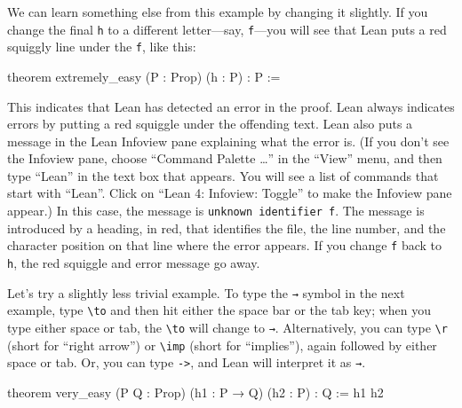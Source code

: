 \documentclass[
  letterpaper,
  DIV=11,
  numbers=noendperiod]{scrreprt}
\makeatletter
\newenvironment{Shaded}{\begin{snugshade}}{\end{snugshade}}
\newcommand{\ErrorTok}[1]{\textcolor[rgb]{0.68,0.00,0.00}{#1}}
\newcommand{\KeywordTok}[1]{\textcolor[rgb]{0.00,0.23,0.31}{#1}}
\newcommand{\NormalTok}[1]{\textcolor[rgb]{0.00,0.23,0.31}{#1}}
\newcommand{\SpecialCharTok}[1]{\textcolor[rgb]{0.37,0.37,0.37}{#1}}
\def\squiggly{\bgroup \markoverwith{\textcolor{red}{\lower3.5\p@\hbox{\sixly \char58}}}\ULon}
\renewcommand{\NormalTok}[1]{\textcolor[HTML]{000000}{#1}}
\renewcommand{\KeywordTok}[1]{\textcolor[HTML]{0000FF}{#1}}
\renewcommand{\SpecialCharTok}[1]{}
\renewcommand{\ErrorTok}[1]{\squiggly{#1}}
\newcommand{\excl}[1]{}
\makeatother
\begin{document}
We can learn something else from this example by changing it slightly.
If you change the final \texttt{h} to a different letter---say,
\texttt{f}---you will see that Lean puts a red squiggly line under the
\texttt{f}, like this:

\begin{Shaded}
\begin{Highlighting}[]
\KeywordTok{theorem}\NormalTok{ extremely\_easy (P : }\KeywordTok{Prop}\NormalTok{) (h : P) : P := }\SpecialCharTok{!!}\ErrorTok{f}\SpecialCharTok{!!}
\end{Highlighting}
\end{Shaded}

This indicates that Lean has detected an error in the proof. Lean always
indicates errors by putting a red squiggle under the offending text.
Lean also puts a message in the Lean Infoview pane explaining what the
error is. (If you don't see the Infoview pane, choose ``Command Palette
\ldots{}'' in the ``View'' menu, and then type ``Lean'' in the text box
that appears. You will see a list of commands that start with ``Lean''.
Click on ``Lean 4: Infoview: Toggle'' to make the Infoview pane appear.)
In this case, the message is
\texttt{unknown\ identifier\ \textquotesingle{}f\textquotesingle{}}. The
message is introduced by a heading, in red, that identifies the file,
the line number, and the character position on that line where the error
appears. If you change \texttt{f} back to \texttt{h}, the red squiggle
and error message go away.

Let's try a slightly less trivial example. To type the \texttt{→} symbol
in the next example, type \texttt{\textbackslash{}to} and then hit
either the space bar or the tab key; when you type either space or tab,
the \texttt{\textbackslash{}to} will change to \texttt{→}.
Alternatively, you can type \texttt{\textbackslash{}r} (short for
``right arrow'') or \texttt{\textbackslash{}imp} (short for
``implies''), again followed by either space or tab. Or, you can type
\excl{\texttt{-\textgreater{}}}\texttt{-\null>}, and Lean will interpret
it as \texttt{→}.

\begin{Shaded}
\begin{Highlighting}[]
\KeywordTok{theorem}\NormalTok{ very\_easy}
\NormalTok{(P Q : }\KeywordTok{Prop}\NormalTok{) (h1 : P → Q) (h2 : P) : Q := h1 h2}
\end{Highlighting}
\end{Shaded}
\end{document}
